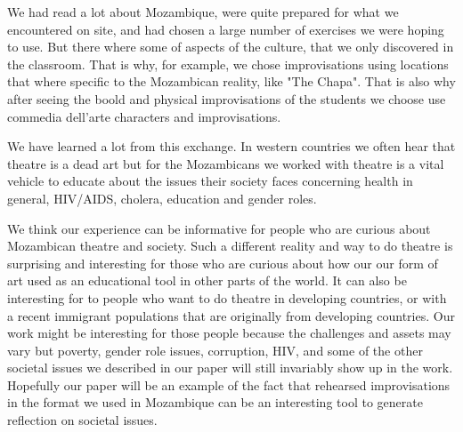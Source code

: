 \documentclass[article,twocolumn,twoside]{memoir}
\begin{document}
We had read a lot about Mozambique, were quite prepared for what we encountered
on site, and had chosen a large number of exercises we were hoping to use. But
there where some of aspects of the culture, that we only discovered in the
classroom. That is why, for example, we chose improvisations using locations
that where specific to the Mozambican reality, like "The Chapa". That is also
why after seeing the boold and physical improvisations of the students we choose
use commedia dell'arte characters and improvisations.

We have learned a lot from this exchange. In western countries we often hear
that theatre is a dead art but for the Mozambicans we worked with theatre is a
vital vehicle to educate about the issues their society faces concerning
health in general, HIV/AIDS, cholera, education and gender roles.

We think our experience can be informative for people who are curious about
Mozambican theatre and society. Such a different reality and way to do theatre
is surprising and interesting for those who are curious about how our our form
of art used as an educational tool in other parts of the world. It can also be
interesting for to people who want to do theatre in developing countries, or
with a recent immigrant populations that are originally from developing countries.
Our work might be interesting for those people because the challenges and assets
may vary but poverty, gender role issues, corruption, HIV, and some of the
other societal issues we described in our paper will still invariably show up
in the work. Hopefully our paper will be an example of the fact that rehearsed
improvisations in the format we used in Mozambique can be an interesting tool
to generate reflection on societal issues.
\end{document}
